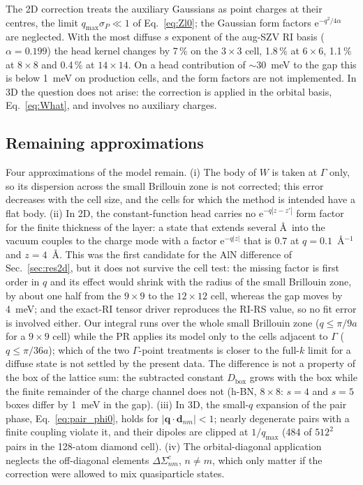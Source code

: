 \documentclass[%
 reprint,
superscriptaddress,
 amsmath,amssymb,
 aps,
prb,
]{revtex4-2}
\newcommand{\bq}{\mathbf{q}}
\newcommand{\ee}{\mathrm{e}}
\begin{document}
The 2D correction treats the auxiliary Gaussians as point charges at their centres, the limit
$q_\mathrm{max}\sigma_P\ll1$ of Eq.~\eqref{eq:Zl0}; the Gaussian form factors
$\ee^{-q^2/4\alpha}$ are neglected. With the most diffuse $s$ exponent of the aug-SZV RI basis
($\alpha = 0.199$) the head kernel changes by 7\,\% on the $3\times3$ cell, 1.8\,\% at
$6\times6$, 1.1\,\% at $8\times8$ and 0.4\,\% at $14\times14$. On a head contribution of
$\sim30$~meV to the gap this is below 1~meV on production cells, and the form factors are not
implemented. In 3D the question does not arise: the correction is applied in the orbital basis,
Eq.~\eqref{eq:What}, and involves no auxiliary charges.

\subsection{Remaining approximations}
\label{sec:disc_approx}
\label{sec:approx}

Four approximations of the model remain. (i) The body of $W$ is taken at $\Gamma$ only, so its
dispersion across the small Brillouin zone is not corrected; this error decreases with the cell
size, and the cells for which the method is intended have a flat body. (ii) In 2D, the
constant-function head carries no $\ee^{-q|z-z'|}$ form factor for the finite thickness of the
layer: a state that extends several \AA\ into the vacuum couples to the charge mode with a
factor $\ee^{-q|z|}$ that is $0.7$ at $q=0.1$~\AA$^{-1}$ and $z=4$~\AA. This was the first
candidate for the AlN difference of Sec.~\ref{sec:res2d}, but it does not survive the cell
test: the missing factor is first order in $q$ and its effect would shrink with the radius of
the small Brillouin zone, by about one half from the $9\times9$ to the $12\times12$ cell,
whereas the gap moves by 4~meV; and the exact-RI tensor driver reproduces the RI-RS value, so no
fit error is involved either. Our integral runs over the whole small Brillouin zone
($q\le\pi/9a$ for a $9\times9$ cell) while the PR applies its model only to the cells adjacent
to $\Gamma$ ($q\le\pi/36a$); which of the two $\Gamma$-point treatments is closer to the
full-$k$ limit for a diffuse state is not settled by the present data. The difference is not a
property of the box of the lattice sum: the subtracted constant
$D_\mathrm{box}$ grows with the box while the finite remainder of the charge channel does not
(h-BN, $8\times8$: $s=4$ and $s=5$ boxes differ by 1~meV in the gap). (iii) In 3D, the
small-$q$ expansion of the pair phase, Eq.~\eqref{eq:pair_phi0}, holds for $|\bq\cdot\mathbf
d_{nm}|<1$; nearly degenerate pairs with a finite coupling violate it, and their dipoles are
clipped at $1/q_{\max}$ (484 of $512^2$ pairs in the 128-atom diamond cell). (iv) The
orbital-diagonal application neglects the off-diagonal elements $\Delta\Sigma^c_{nm}$,
$n\neq m$, which only matter if the correction were allowed to mix quasiparticle states.
\end{document}
